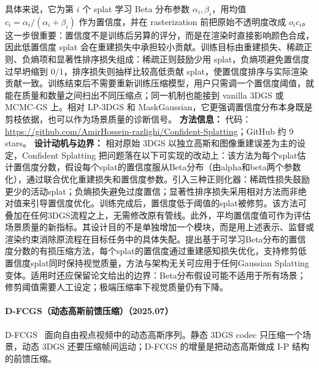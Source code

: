 具体来说，它为第 $i$ 个 splat 学习 Beta 分布参数 $\alpha_i,\beta_i$，用均值 $c_i=\alpha_i/(\alpha_i+\beta_i)$ 作为置信度，并在 rasterization 前把原始不透明度改成 $o_i c_i$。这一步很重要：置信度不是训练后另算的评分，而是在渲染时直接影响颜色合成，因此低置信度 splat 会在重建损失中承担较小贡献。训练目标由重建损失、稀疏正则、负熵项和显著性排序损失组成：稀疏正则鼓励少用 splat，负熵项避免置信度过早坍缩到 0/1，排序损失则抽样比较高低贡献 splat，使置信度排序与实际渲染贡献一致。训练结束后不需要重新训练压缩模型，用户只需调一个置信度阈值，就能在质量和数量之间扫出不同压缩点；同一机制也能接到 vanilla 3DGS 或 MCMC-GS 上。相对 LP-3DGS 和 MaskGaussian，它更强调置信度分布本身既是剪枝依据，也可以作为场景质量的诊断信号。
\textbf{方法信息：} 代码：\url{https://github.com/AmirHossein-razlighi/Confident-Splatting}；GitHub 约 9 stars。
\textbf{设计动机与边界：} 相对原始 3DGS 以独立高斯和图像重建误差为主的设定，Confident Splatting 把问题落在以下可实现的改动上：该方法为每个splat估计置信度分数，假设每个splat的置信度服从Beta分布（由alpha和beta两个参数化），通过联合优化重建损失和置信度参数。引入三种正则化器：稀疏性损失鼓励更少的活动splat；负熵损失避免过度置信；显著性排序损失采用相对方法而非绝对值来引导置信度优化。训练完成后，置信度低于阈值的splat被修剪。该方法可叠加在任何3DGS流程之上，无需修改原有管线。此外，平均置信度值可作为评估场景质量的新指标。其设计目的不是单独增加一个模块，而是用上述表示、监督或渲染约束消除原流程在目标任务中的具体失配。提出基于可学习Beta分布的置信度分数的有损压缩方法，每个splat的置信度通过重建感知损失优化，支持修剪低置信度splat同时保持视觉质量，方法与架构无关可应用于任何Gaussian Splatting变体。适用时还应保留论文给出的边界：Beta分布假设可能不适用于所有场景；修剪阈值需要人工设定；极端压缩率下视觉质量仍有下降。
\paragraph{D-FCGS（动态高斯前馈压缩）（2025.07）}
D-FCGS~\cite{2507_05859} 面向自由视点视频中的动态高斯序列。静态 3DGS codec 只压缩一个场景，动态 3DGS 还要压缩帧间运动；D-FCGS 的增量是把动态高斯做成 I-P 结构的前馈压缩。

